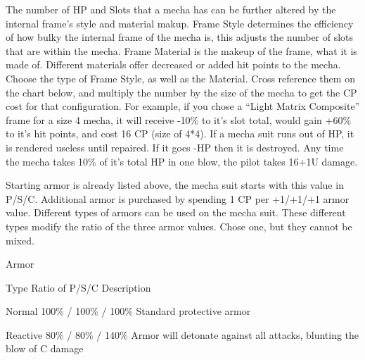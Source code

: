 \documentclass[twoside]{book}
\begin{document}
                    The number of HP and Slots that a mecha has can
                   be further altered by the internal frame’s style
                   and material makup. Frame Style determines the
                   efficiency of how bulky the internal frame of the
                   mecha is, this adjusts the number of slots that are
                   within the mecha. Frame Material is the makeup of the
                   frame, what it is made of. Different materials offer
                   decreased or added hit points to the mecha. Choose the
                   type of Frame Style, as well as the Material. Cross
                   reference them on the chart below, and multiply the
                   number by the size of the mecha to get the CP cost for
                   that configuration. 
                    For example, if you chose a “Light Matrix
                   Composite” frame for a size 4 mecha, it will
                   receive -10\% to it’s slot total, would gain +60\%
                   to it’s hit points, and cost 16 CP (size of
                   4*4). 
                    If a mecha suit runs out of HP, it is rendered
                   useless until repaired. If it goes -HP then it is
                   destroyed. Any time the mecha takes 10\% of it’s
                   total HP in one blow, the pilot takes 16+1U damage.
                   
                
                  Starting armor is already listed above, the mecha
                 suit starts with this value in P/S/C. Additional armor
                 is purchased by spending 1 CP per +1/+1/+1 armor value.
                 Different types of armors can be used on the mecha suit.
                 These different types modify the ratio of the three
                 armor values. Chose one, but they cannot be mixed.
                 
                
                Armor  
                  
                    
                      
                       Type   
                       Ratio of P/S/C   
                       Description   
                      
                      
                       Normal   
                       100\% / 100\% / 100\%   
                       Standard protective armor   
                      
                      
                       Reactive   
                       80\% / 80\% / 140\%   
                         Armor will detonate against all attacks,
                         blunting the blow of C damage 
                      
\end{document}
